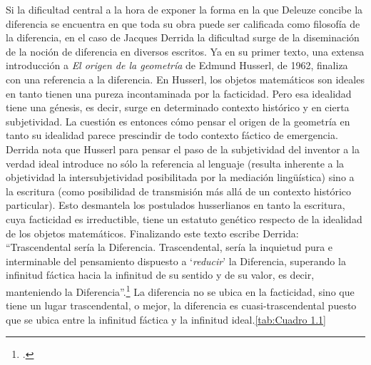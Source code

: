 Si la dificultad central a la hora de exponer la forma en la que Deleuze concibe la diferencia se encuentra en que toda su obra puede ser calificada como filosofía de la diferencia, en el caso de Jacques Derrida la dificultad surge de la diseminación de la noción de diferencia en diversos escritos. Ya en su primer texto, una extensa introducción a \emph{El origen de la geometría} de Edmund Husserl, de 1962, finaliza con una referencia a la diferencia. En Husserl, los objetos matemáticos son ideales en tanto tienen una pureza incontaminada por la facticidad. Pero esa idealidad tiene una génesis, es decir, surge en determinado contexto histórico y en cierta subjetividad. La cuestión es entonces cómo pensar el origen de la geometría en tanto su idealidad parece prescindir de todo contexto fáctico de emergencia. Derrida nota que Husserl para pensar el paso de la subjetividad del inventor a la verdad ideal introduce no sólo la referencia al lenguaje (resulta inherente a la objetividad la intersubjetividad posibilitada por la mediación lingüística) sino a la escritura (como posibilidad de transmisión más allá de un contexto histórico particular). Esto desmantela los postulados husserlianos en tanto la escritura, cuya facticidad es irreductible, tiene un estatuto genético respecto de la idealidad de los objetos matemáticos. Finalizando este texto escribe Derrida: \enquote{Trascendental sería la Diferencia. Trascendental, sería la inquietud pura e interminable del pensamiento dispuesto a \enquote{\emph{reducir}} la Diferencia, superando la infinitud fáctica hacia la infinitud de su sentido y de su valor, es decir, manteniendo la Diferencia}.\footcite[162]{@6978-DERRIDA2000} La diferencia no se ubica en la facticidad, sino que tiene un lugar trascendental, o mejor, la diferencia es cuasi-trascendental puesto que se ubica entre la infinitud fáctica y la infinitud ideal.\ref{tab:Cuadro 1.1}

